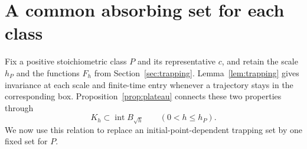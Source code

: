 \section{A common absorbing set for each class}\label{sec:permanence}

Fix a positive stoichiometric class $P$ and its representative $c$, and
retain the scale $h_P$ and the functions $F_h$ from
Section~\ref{sec:trapping}. Lemma~\ref{lem:trapping} gives invariance
at each scale and finite-time entry whenever a trajectory stays in the
corresponding box. Proposition~\ref{prop:plateau} connects these two
properties through
\begin{equation}\label{eq:scale-containment}
 K_h\subset\operatorname{int}B_{\sqrt h}
 \qquad(0<h\leq h_P).
\end{equation}
We now use this relation to replace an initial-point-dependent trapping
set by one fixed set for $P$.

